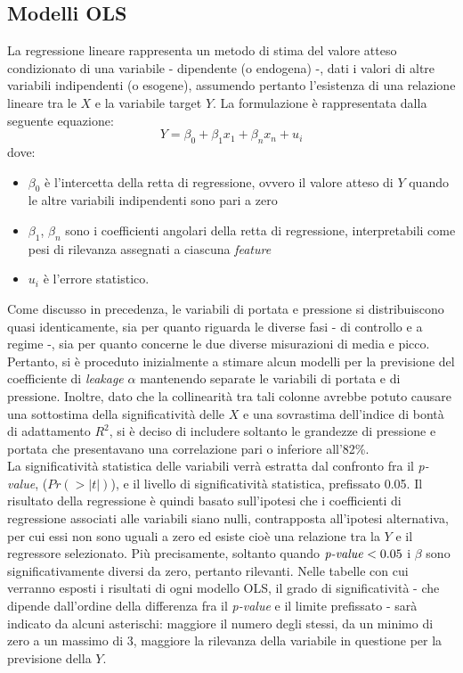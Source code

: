 \documentclass[fleqn,10pt]{SelfArx} %
\begin{document}
\subsection{Modelli OLS}
La regressione lineare rappresenta un metodo di stima del valore atteso condizionato di una variabile - dipendente (o endogena) -, dati i valori di altre variabili indipendenti (o esogene), assumendo pertanto l'esistenza di una relazione lineare tra le $X$ e
la variabile target $Y$. La formulazione è rappresentata dalla seguente equazione:
\begin{equation}\label{eqnonlei}
    Y = \beta_{0} + \beta_{1}x_{1} + \beta_{n}x_{n} + u_{i}
\end{equation}
dove:
\begin{itemize}
    \item $\beta_{0}$ è l'intercetta della retta di regressione, ovvero il valore atteso di $Y$ quando le altre variabili indipendenti sono pari a zero
    \item $\beta_{1}$, $\beta_{n}$ sono i coefficienti angolari della retta di regressione, interpretabili come pesi di rilevanza assegnati a ciascuna \textit{feature}
    \item $u_{i}$ è l'errore statistico.
\end{itemize}
Come discusso in precedenza, le variabili di portata e pressione si distribuiscono quasi identicamente, sia per quanto riguarda le diverse fasi - di controllo e a regime -, sia per quanto concerne le due diverse misurazioni di media e picco. Pertanto, si è proceduto inizialmente a stimare alcun modelli per la previsione del coefficiente di \textit{leakage} $\alpha$ mantenendo separate le variabili di portata e di pressione. Inoltre, dato che la collinearità tra tali colonne avrebbe potuto causare una sottostima della significatività delle $X$ e una sovrastima dell'indice di bontà di adattamento $R^2$, si è deciso di includere soltanto le grandezze di pressione e portata che presentavano una correlazione pari o inferiore all'82\%.\\
La significatività statistica delle variabili verrà estratta dal confronto fra il \textit{p-value}, ($Pr(>|t|)$), e il livello di significatività statistica, prefissato 0.05. Il risultato della regressione è quindi basato sull’ipotesi che i coefficienti di regressione associati alle variabili siano nulli, contrapposta all'ipotesi alternativa, per cui essi non sono uguali a zero ed esiste cioè una relazione tra la $Y$ e il regressore selezionato. Più precisamente, soltanto quando $\text{\textit{p-value}} < 0.05$ i $\beta$ sono significativamente diversi da zero, pertanto rilevanti. Nelle tabelle con cui verranno esposti i risultati di ogni modello OLS, il grado di significatività - che dipende dall'ordine della differenza fra il \textit{p-value} e il limite prefissato - sarà indicato da alcuni asterischi: maggiore il numero degli stessi, da un minimo di zero a un massimo di 3, maggiore la rilevanza della variabile in questione per la previsione della $Y$.\\
\end{document}
